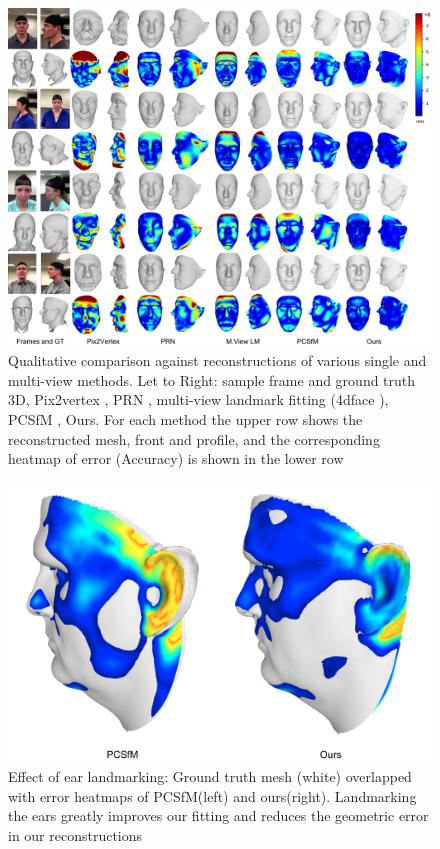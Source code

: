 \begin{figure}
\begin{center}
   \includegraphics[width=1\linewidth]{images/qual_figure.pdf}
\end{center}
  \caption{Qualitative comparison against reconstructions of various single and multi-view methods. Let to Right: sample frame and ground truth 3D, Pix2vertex \cite{sela2017unrestricted}, PRN \cite{feng2018joint}, multi-view landmark fitting (4dface \cite{huber2016multiresolution}), PCSfM \cite{hernandez2017accurate}, Ours. For each method the upper row shows the reconstructed mesh, front and profile, and the corresponding heatmap of error (Accuracy) is shown in the lower row }
\label{fig:results}
\end{figure}


\begin{figure}
\begin{center}
   \includegraphics[width=0.8\linewidth]{images/ear_align.png}
\end{center}
   \caption{Effect of ear landmarking: Ground truth mesh (white) overlapped with error heatmaps of PCSfM(left) and ours(right). Landmarking the ears greatly improves our fitting and reduces the geometric error in our reconstructions }
\label{fig:ear_align}
\end{figure}

